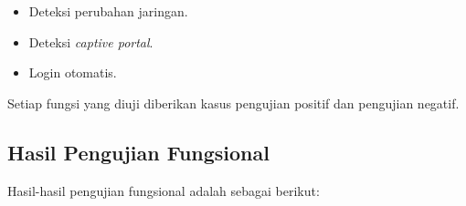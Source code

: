\begin{itemize}
    \item{Deteksi perubahan jaringan.}
    \item{Deteksi \textit{captive portal}.}
    \item{Login otomatis.}
\end{itemize}

Setiap fungsi yang diuji diberikan kasus pengujian positif dan pengujian negatif.

\subsection{Hasil Pengujian Fungsional}
\label{subsec:hasil_pengujian_fungsional}

Hasil-hasil pengujian fungsional adalah sebagai berikut:

